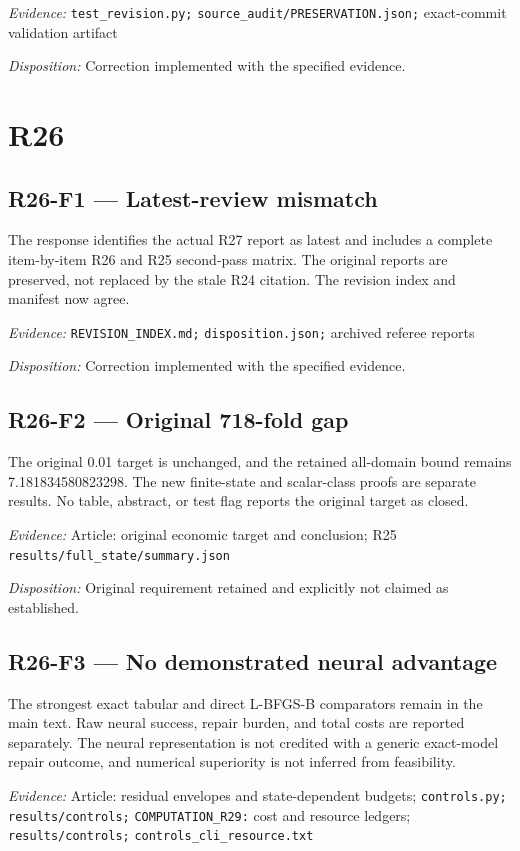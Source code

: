 \emph{Evidence:} \nolinkurl{test_revision.py;} \nolinkurl{source_audit/PRESERVATION.json;} exact-commit validation artifact

\emph{Disposition:} Correction implemented with the specified evidence.
\section{R26}
\subsection{R26-F1 --- Latest-review mismatch}
The response identifies the actual R27 report as latest and includes a complete item-by-item R26 and R25 second-pass matrix. The original reports are preserved, not replaced by the stale R24 citation. The revision index and manifest now agree.

\emph{Evidence:} \nolinkurl{REVISION_INDEX.md;} \nolinkurl{disposition.json;} archived referee reports

\emph{Disposition:} Correction implemented with the specified evidence.
\subsection{R26-F2 --- Original 718-fold gap}
The original 0.01 target is unchanged, and the retained all-domain bound remains 7.181834580823298. The new finite-state and scalar-class proofs are separate results. No table, abstract, or test flag reports the original target as closed.

\emph{Evidence:} Article: original economic target and conclusion; R25 \nolinkurl{results/full_state/summary.json}

\emph{Disposition:} Original requirement retained and explicitly not claimed as established.
\subsection{R26-F3 --- No demonstrated neural advantage}
The strongest exact tabular and direct L-BFGS-B comparators remain in the main text. Raw neural success, repair burden, and total costs are reported separately. The neural representation is not credited with a generic exact-model repair outcome, and numerical superiority is not inferred from feasibility.

\emph{Evidence:} Article: residual envelopes and state-dependent budgets; \nolinkurl{controls.py;} \nolinkurl{results/controls;} \nolinkurl{COMPUTATION_R29:} cost and resource ledgers; \nolinkurl{results/controls;} \nolinkurl{controls_cli_resource.txt}

